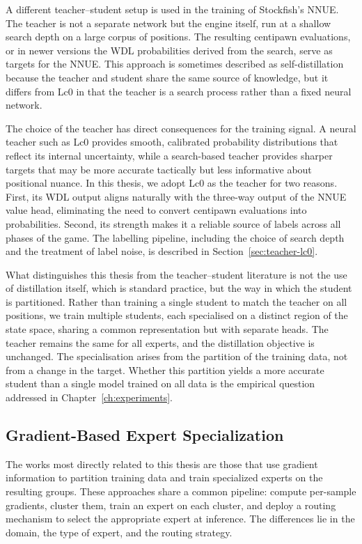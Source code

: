 A different teacher--student setup is used in the training of Stockfish's NNUE. The teacher is not a separate network but the engine itself, run at a shallow search depth on a large corpus of positions. The resulting centipawn evaluations, or in newer versions the WDL probabilities derived from the search, serve as targets for the NNUE. This approach is sometimes described as self-distillation because the teacher and student share the same source of knowledge, but it differs from Lc0 in that the teacher is a search process rather than a fixed neural network.

The choice of the teacher has direct consequences for the training signal. A neural teacher such as Lc0 provides smooth, calibrated probability distributions that reflect its internal uncertainty, while a search-based teacher provides sharper targets that may be more accurate tactically but less informative about positional nuance. In this thesis, we adopt Lc0 as the teacher for two reasons. First, its WDL output aligns naturally with the three-way output of the NNUE value head, eliminating the need to convert centipawn evaluations into probabilities. Second, its strength makes it a reliable source of labels across all phases of the game. The labelling pipeline, including the choice of search depth and the treatment of label noise, is described in Section~\ref{sec:teacher-lc0}.

What distinguishes this thesis from the teacher--student literature is not the use of distillation itself, which is standard practice, but the way in which the student is partitioned. Rather than training a single student to match the teacher on all positions, we train multiple students, each specialised on a distinct region of the state space, sharing a common representation but with separate heads. The teacher remains the same for all experts, and the distillation objective is unchanged. The specialisation arises from the partition of the training data, not from a change in the target. Whether this partition yields a more accurate student than a single model trained on all data is the empirical question addressed in Chapter~\ref{ch:experiments}.

\subsection{Gradient-Based Expert Specialization}\label{sec:rw-grad-experts}

The works most directly related to this thesis are those that use gradient information to partition training data and train specialized experts on the resulting groups. These approaches share a common pipeline: compute per-sample gradients, cluster them, train an expert on each cluster, and deploy a routing mechanism to select the appropriate expert at inference. The differences lie in the domain, the type of expert, and the routing strategy.

